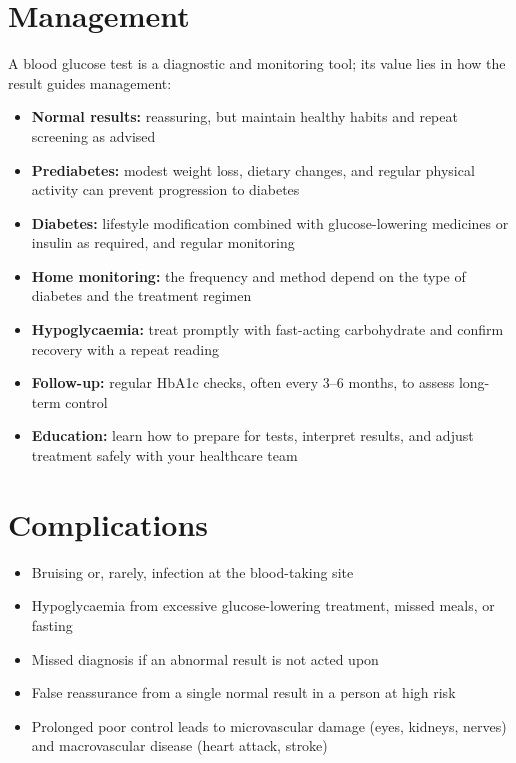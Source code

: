 \section*{Management}
A blood glucose test is a diagnostic and monitoring tool; its value lies in how the result guides management:

\begin{itemize}
    \item \textbf{Normal results:} reassuring, but maintain healthy habits and repeat screening as advised
    \item \textbf{Prediabetes:} modest weight loss, dietary changes, and regular physical activity can prevent progression to diabetes
    \item \textbf{Diabetes:} lifestyle modification combined with glucose-lowering medicines or insulin as required, and regular monitoring
    \item \textbf{Home monitoring:} the frequency and method depend on the type of diabetes and the treatment regimen
    \item \textbf{Hypoglycaemia:} treat promptly with fast-acting carbohydrate and confirm recovery with a repeat reading
    \item \textbf{Follow-up:} regular HbA1c checks, often every 3--6 months, to assess long-term control
    \item \textbf{Education:} learn how to prepare for tests, interpret results, and adjust treatment safely with your healthcare team
\end{itemize}

\section*{Complications}
\begin{itemize}
    \item Bruising or, rarely, infection at the blood-taking site
    \item Hypoglycaemia from excessive glucose-lowering treatment, missed meals, or fasting
    \item Missed diagnosis if an abnormal result is not acted upon
    \item False reassurance from a single normal result in a person at high risk
    \item Prolonged poor control leads to microvascular damage (eyes, kidneys, nerves) and macrovascular disease (heart attack, stroke)
\end{itemize}

